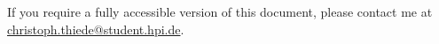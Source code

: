 
\noindent
\begingroup
	If you require a fully accessible version of this document, please contact me at \href{mailto:christoph.thiede@student.hpi.de}{christoph.\allowbreak thiede@\allowbreak student.hpi.de}.
\endgroup

